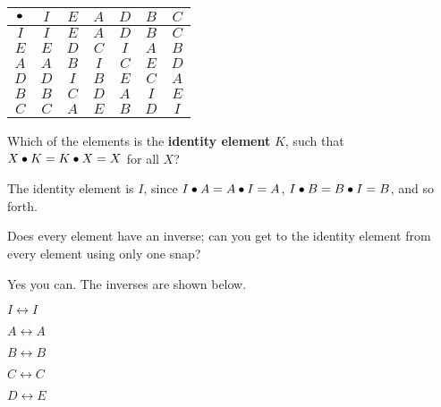 \documentclass[../gatm_answers.tex]{subfiles}
\begin{document}
\begin{center}
	\begin{tabular}{c|cccccc}
		\hline
		$\bullet$ & $I$ & $E$ & $A$ & $D$ & $B$ & $C$ \\ \hline
		\rowcolor{light-gray}
		$I$ & $I$ & $E$ & $A$ & $D$ & $B$ & $C$ \\
		$E$ & $E$ & $D$ & $C$ & $I$ & $A$ & $B$ \\
		\rowcolor{light-gray}
		$A$ & $A$ & $B$ & $I$ & $C$ & $E$ & $D$ \\
		$D$ & $D$ & $I$ & $B$ & $E$ & $C$ & $A$ \\
		\rowcolor{light-gray}
		$B$ & $B$ & $C$ & $D$ & $A$ & $I$ & $E$ \\
		$C$ & $C$ & $A$ & $E$ & $B$ & $D$ & $I$ \\ \hline
	\end{tabular}
\end{center}

\begin{outer_problem}
	\item Which of the elements is the \textbf{identity element} $K$, such that $X\bullet K = K\bullet X = X$ for all $X$? \label{prob:group_definition_start}
\end{outer_problem}

\noindent The identity element is $I$, since $I\bullet A = A\bullet I = A$, $I\bullet B = B\bullet I = B$, and so forth.

\begin{outer_problem}
	\item Does every element have an inverse; can you get to the identity element from every element using only one snap?
\end{outer_problem}

\noindent Yes you can. The inverses are shown below.
\begin{center}
	\begin{minipage}{0.18\textwidth}
		\centering
		$I\leftrightarrow I$
	\end{minipage}\hfill
	\begin{minipage}{0.18\textwidth}
		\centering
		$A\leftrightarrow A$
	\end{minipage}\hfill
	\begin{minipage}{0.18\textwidth}
		\centering
		$B\leftrightarrow B$
	\end{minipage}\hfill
	\begin{minipage}{0.18\textwidth}
		\centering
		$C\leftrightarrow C$
	\end{minipage}\hfill
	\begin{minipage}{0.18\textwidth}
		\centering
		$D\leftrightarrow E$
	\end{minipage}
\end{center}
\end{document}
